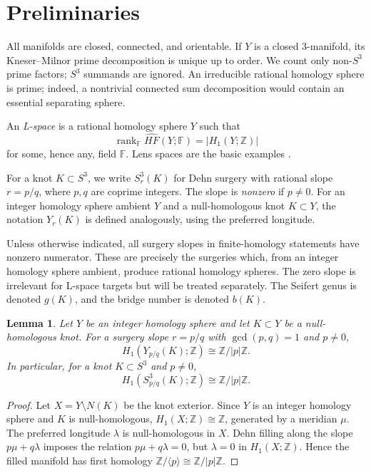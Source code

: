 \documentclass[12pt]{article}
\newtheorem{lemma}[theorem]{Lemma}
\theoremstyle{definition}
\newcommand{\Z}{\mathbb Z}
\newcommand{\F}{\mathbb F}
\newcommand{\HFhat}{\widehat{HF}}
\DeclareMathOperator{\rank}{rank}
\begin{document}
\section{Preliminaries}
\label{sec:prelim}

All manifolds are closed, connected, and orientable.  If \(Y\) is a closed 3-manifold, its Kneser--Milnor prime decomposition is unique up to order.  We count only non-\(S^3\) prime factors; \(S^3\) summands are ignored.  An irreducible rational homology sphere is prime; indeed, a nontrivial connected sum decomposition would contain an essential separating sphere.

An \emph{L-space} is a rational homology sphere \(Y\) such that
\[
\rank_{\F}\HFhat(Y;\F)=|H_1(Y;\Z)|
\]
for some, hence any, field \(\F\).  Lens spaces are the basic examples \cite{OSz}.

For a knot \(K\subset S^3\), we write \(S^3_r(K)\) for Dehn surgery with rational slope \(r=p/q\), where \(p,q\) are coprime integers.  The slope is \emph{nonzero} if \(p\neq 0\).  For an integer homology sphere ambient \(Y\) and a null-homologous knot \(K\subset Y\), the notation \(Y_r(K)\) is defined analogously, using the preferred longitude.

Unless otherwise indicated, all surgery slopes in finite-homology statements have nonzero numerator.  These are precisely the surgeries which, from an integer homology sphere ambient, produce rational homology spheres.  The zero slope is irrelevant for L-space targets but will be treated separately.
The Seifert genus is denoted \(g(K)\), and the bridge number is denoted \(b(K)\).

\begin{lemma}\label{lem:h1-surgery}
Let \(Y\) be an integer homology sphere and let \(K\subset Y\) be a null-homologous knot.  For a surgery slope \(r=p/q\) with \(\gcd(p,q)=1\) and \(p\neq 0\),
\[
H_1(Y_{p/q}(K);\Z)\cong \Z/|p|\Z.
\]
In particular, for a knot \(K\subset S^3\) and \(p\neq 0\),
\[
H_1(S^3_{p/q}(K);\Z)\cong \Z/|p|\Z.
\]
\end{lemma}

\begin{proof}
Let \(X=Y\setminus N(K)\) be the knot exterior.  Since \(Y\) is an integer homology sphere and \(K\) is null-homologous, \(H_1(X;\Z)\cong \Z\), generated by a meridian \(\mu\).  The preferred longitude \(\lambda\) is null-homologous in \(X\).  Dehn filling along the slope \(p\mu+q\lambda\) imposes the relation \(p\mu+q\lambda=0\), but \(\lambda=0\) in \(H_1(X;\Z)\).  Hence the filled manifold has first homology \(\Z/\langle p\rangle\cong \Z/|p|\Z\).
\end{proof}
\end{document}
